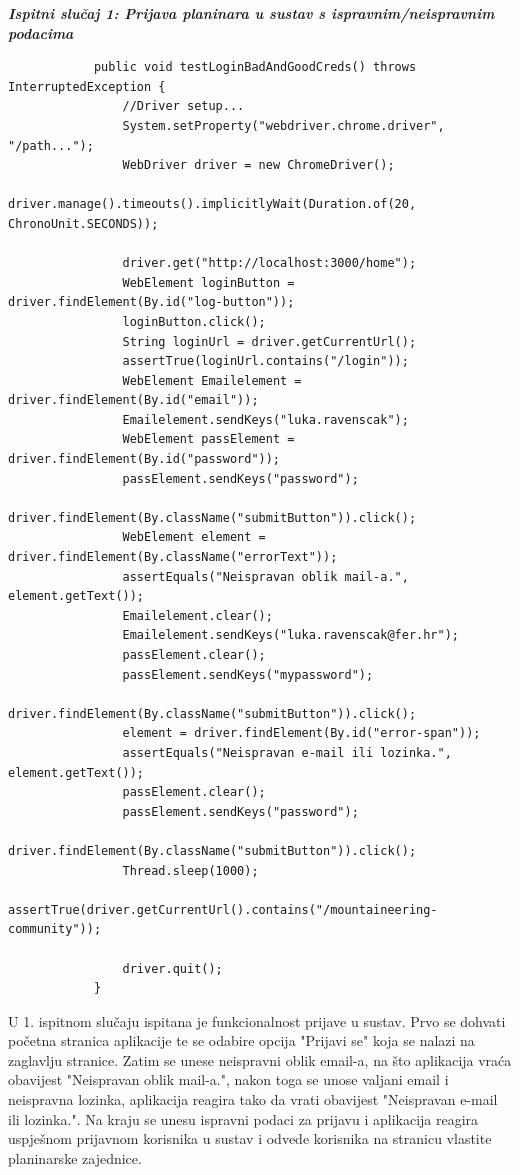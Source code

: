 		
		 	\textbf{\textit{Ispitni slučaj 1: Prijava planinara u sustav s ispravnim/neispravnim podacima}}
		 	
		 	\begin{lstlisting}
		 	public void testLoginBadAndGoodCreds() throws InterruptedException {
		 		//Driver setup...
		 		System.setProperty("webdriver.chrome.driver", "/path...");
		 		WebDriver driver = new ChromeDriver(); 
		 		driver.manage().timeouts().implicitlyWait(Duration.of(20, ChronoUnit.SECONDS));
		 		
		 		driver.get("http://localhost:3000/home");
		 		WebElement loginButton = driver.findElement(By.id("log-button"));
		 		loginButton.click();
		 		String loginUrl = driver.getCurrentUrl();
		 		assertTrue(loginUrl.contains("/login"));
		 		WebElement Emailelement = driver.findElement(By.id("email"));        
		 		Emailelement.sendKeys("luka.ravenscak");   
		 		WebElement passElement = driver.findElement(By.id("password"));
		 		passElement.sendKeys("password");
		 		driver.findElement(By.className("submitButton")).click();
		 		WebElement element = driver.findElement(By.className("errorText"));
		 		assertEquals("Neispravan oblik mail-a.", element.getText());
		 		Emailelement.clear();
		 		Emailelement.sendKeys("luka.ravenscak@fer.hr");
		 		passElement.clear();
		 		passElement.sendKeys("mypassword");
		 		driver.findElement(By.className("submitButton")).click();
		 		element = driver.findElement(By.id("error-span"));
		 		assertEquals("Neispravan e-mail ili lozinka.", element.getText());
		 		passElement.clear();
		 		passElement.sendKeys("password");
		 		driver.findElement(By.className("submitButton")).click();
		 		Thread.sleep(1000);
		 		assertTrue(driver.getCurrentUrl().contains("/mountaineering-community"));
		 		
		 		driver.quit();
		 	}
		 	\end{lstlisting}
	 	
	 	 U 1. ispitnom slučaju ispitana je funkcionalnost prijave u sustav. Prvo se dohvati početna stranica aplikacije te se odabire opcija "Prijavi se" koja se nalazi na zaglavlju stranice. Zatim se unese neispravni oblik email-a, na što aplikacija vraća obavijest "Neispravan oblik mail-a.", nakon toga se unose valjani email i neispravna lozinka, aplikacija reagira tako da vrati obavijest "Neispravan e-mail ili lozinka.". Na kraju se unesu ispravni podaci za prijavu i aplikacija reagira uspješnom prijavnom korisnika u sustav i odvede korisnika na stranicu vlastite planinarske zajednice.\newline
	 	 
